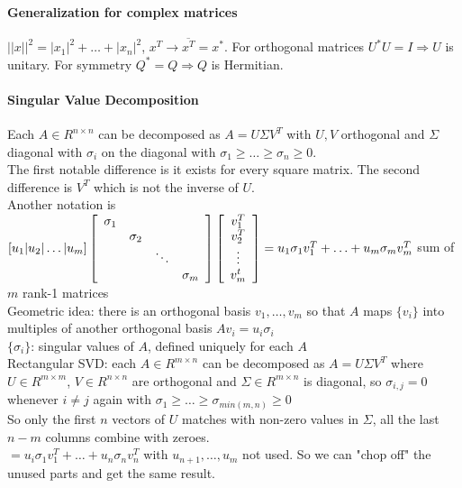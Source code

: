 \documentclass[10pt]{report}
\begin{document}
\paragraph{Generalization for complex matrices} $||x||^2 = |x_1|^2 + \ldots + |x_n|^2$, $x^T \longrightarrow \overline{x^T} = x^*$. For orthogonal matrices $U^*U=I \Rightarrow U$ is unitary. For symmetry $Q^* = Q \Rightarrow Q$ is Hermitian.
\paragraph{Singular Value Decomposition} Each $A\in R^{n\times n}$ can be decomposed as $A = U\Sigma V^T$ with $U, V$ orthogonal and $\Sigma$ diagonal with $\sigma_i$ on the diagonal with $\sigma_1 \geq \ldots \geq \sigma_n \geq 0$.\\
The first notable difference is it exists for every square matrix. The second difference is $V^T$ which is not the inverse of $U$.\\
Another notation is $[u_1|u_2|\ldots|u_m]\left[\begin{array}{c c c c}
\sigma_1\\ & \sigma_2\\ & & \ddots\\ & & & \sigma_m
\end{array} \right]\left[\begin{array}{c}
v_1^T\\v_2^T\\\vdots\\v_m^t
\end{array} \right] = u_1\sigma_1 v_1^T + \ldots + u_m\sigma_m v_m^T$ sum of $m$ rank-1 matrices\\
Geometric idea: there is an orthogonal basis $v_1,\ldots, v_m$ so that $A$ maps $\{v_i\}$ into multiples of another orthogonal basis $A v_i = u_i \sigma_i$\\
$\{\sigma_i\}$: singular values of $A$, defined uniquely for each $A$\\
Rectangular SVD: each $A\in R^{m\times n}$ can be decomposed as $A = U\Sigma V^T$ where $U\in R^{m\times m}$, $V \in R^{n\times n}$ are orthogonal and $\Sigma\in R^{m\times n}$ is diagonal, so $\sigma_{i,j} = 0$ whenever $i\neq j$ again with $\sigma_1 \geq \ldots \geq \sigma_{min(m, n)} \geq 0$\\
So only the first $n$ vectors of $U$ matches with non-zero values in $\Sigma$, all the last $n-m$ columns combine with zeroes.\\
$= u_i\sigma_1 v_1^T + \ldots + u_n \sigma_n v_n^T$ with $u_{n+1},\ldots, u_m$ not used. So we can "chop off" the unused parts and get the same result.\\
\end{document}
